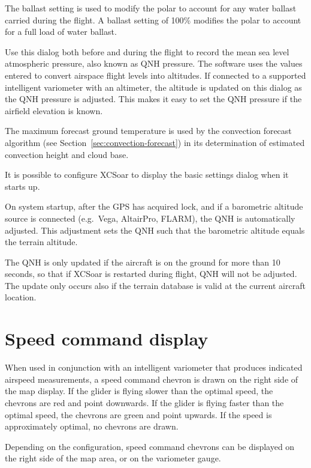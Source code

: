 \documentclass[a4paper,12pt]{refrep}
\begin{document}
The ballast setting is used to modify the polar to account for any
water ballast carried during the flight. A ballast setting of 100\%
modifies the polar to account for a full load of water ballast.  

Use this dialog both before and during the flight to record the mean
sea level atmospheric pressure, also known as QNH pressure.  The
software uses the values entered to convert airspace flight levels
into altitudes.  If connected to a supported intelligent variometer
with an altimeter, the altitude is updated on this dialog as the QNH
pressure is adjusted.  This makes it easy to set the QNH pressure if
the airfield elevation is known.

The maximum forecast ground temperature is used by the convection
forecast algorithm (see Section~\ref{sec:convection-forecast}) in its
determination of estimated convection height and cloud base.

\tip It is possible to configure XCSoar to display the basic
settings dialog when it starts up.

On system startup, after the GPS has acquired lock, and if a
barometric altitude source is connected (e.g.\ Vega, AltairPro,
FLARM), the QNH is automatically adjusted.  This adjustment sets the
QNH such that the barometric altitude equals the terrain altitude.

The QNH is only updated if the aircraft is on the ground for more than
10 seconds, so that if XCSoar is restarted during flight, QNH will not
be adjusted.  The update only occurs also if the terrain database is
valid at the current aircraft location.

\section{Speed command display}

When used in conjunction with an intelligent variometer that produces
indicated airspeed measurements, a speed command chevron is drawn
on the right side of the map display.  If the glider is flying slower
than the optimal speed, the chevrons are red and point downwards.  If
the glider is flying faster than the optimal speed, the chevrons are
green and point upwards.  If the speed is approximately optimal, no
chevrons are drawn.


Depending on the configuration, speed command chevrons can be
displayed on the right side of the map area, or on the variometer
gauge.
\end{document}
